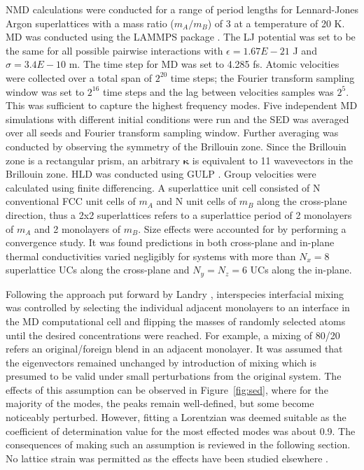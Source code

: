 \documentclass[aps,prb,preprint,preprintnumbers,amsmath,amssymb,floatfix,superscriptaddress]{revtex4}
\begin{document}
NMD calculations were conducted for a range of period lengths for Lennard-Jones Argon superlattices with a mass ratio ($m_A/m_B$) of 3 at a temperature of 20 K. MD was conducted using the LAMMPS package \cite{LAMMPS}. The LJ potential was set to be the same for all possible pairwise interactions with $\epsilon= 1.67E-21$ J and $\sigma= 3.4E-10$ m. The time step for MD was set to 4.285 fs. Atomic velocities were collected over a total span of $2^{20}$ time steps; the Fourier transform sampling window was set to $2^{16}$ time steps and the lag between velocities samples was $2^5$. This was sufficient to capture the highest frequency modes. Five independent MD simulations with different initial conditions were run and the SED was averaged over all seeds and Fourier transform sampling window. Further averaging was conducted by observing the symmetry of the Brillouin zone. Since the Brillouin zone is a rectangular prism, an arbitrary $\pmb{\kappa}$ is equivalent to 11 wavevectors in the Brillouin zone. HLD was conducted using GULP \cite{GULP}. Group velocities were calculated using finite differencing. A superlattice unit cell consisted of N conventional FCC unit cells of $m_A$ and N unit cells of $m_B$ along the cross-plane direction, thus a 2x2 superlattices refers to a superlattice period of 2 monolayers of $m_A$ and 2 monolayers of $m_B$. Size effects were accounted for by performing a convergence study. It was found predictions in both cross-plane and in-plane thermal conductivities varied negligibly for systems with more than $N_x=8$ superlattice UCs along the cross-plane and $N_y=N_z=6$ UCs along the in-plane.

Following the approach put forward by Landry \cite{PhysRevB.79.075316}, interspecies interfacial mixing was controlled by selecting the individual adjacent monolayers to an interface in the MD computational cell and flipping the masses of randomly selected atoms until the desired concentrations were reached. For example, a mixing of 80/20 refers an original/foreign blend in an adjacent monolayer. It was assumed that the eigenvectors remained unchanged by introduction of mixing which is presumed to be valid under small perturbations from the original system. The effects of this assumption can be observed in Figure~\ref{fig:sed}, where for the majority of the modes, the peaks remain well-defined, but some become noticeably perturbed. However, fitting a Lorentzian was deemed suitable as the coefficient of determination value for the most effected modes was about 0.9. The consequences of making such an assumption is reviewed in the following section. No lattice strain was permitted as the effects have been studied elsewhere \cite{PhysRevB.72.174302}.
\end{document}
